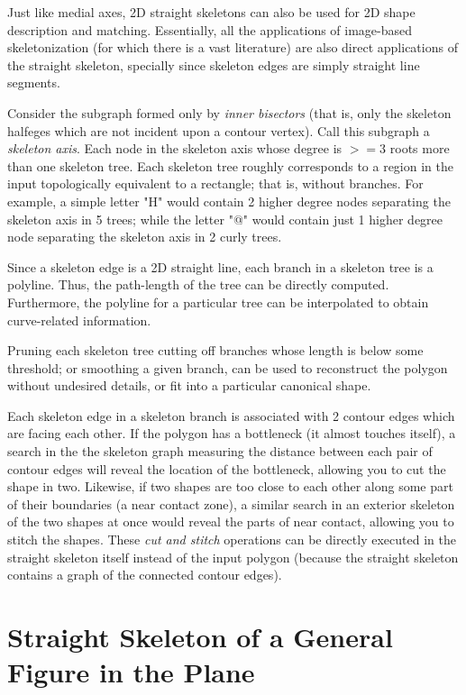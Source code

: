 Just like medial axes, 2D straight skeletons can also be used for 2D shape description and matching. Essentially, all the applications of image-based skeletonization (for which there is a vast literature) are also direct applications of the straight skeleton, specially since skeleton edges are simply straight line segments.

Consider the subgraph formed only by \textit{inner bisectors} (that is, only the skeleton halfeges which are not incident upon a contour vertex). Call this subgraph a {\em skeleton axis}.
Each node in the skeleton axis whose degree is $>=3$ roots more than one skeleton tree. Each skeleton tree roughly corresponds to a region in the input topologically equivalent to a rectangle; that is, without branches. For example, a simple letter "H" would contain 2 higher degree nodes separating the skeleton axis in 5 trees; while the letter "@" would contain just 1 higher degree node separating the skeleton axis in 2 curly trees. 

Since a skeleton edge is a 2D straight line, each branch in a skeleton tree is a polyline. Thus, the path-length of the tree can be directly computed. Furthermore, the polyline for a particular tree can be interpolated to obtain curve-related information.

Pruning each skeleton tree cutting off branches whose length is below some threshold; or smoothing a given branch, can be used to reconstruct the polygon without undesired details, or fit into a particular canonical shape.

Each skeleton edge in a skeleton branch is associated with 2 contour edges which are facing each other. If the polygon has a bottleneck (it almost touches itself), a search in the the skeleton graph measuring the distance between each pair of contour edges will reveal the location of the bottleneck, allowing you to cut the shape in two. Likewise, if two shapes are too close to each other along some part of their boundaries (a near contact zone), a similar search in an exterior skeleton of the two shapes at once would reveal the parts of near contact, allowing you to stitch the shapes. These \textit{cut and stitch} operations can be directly executed in the straight skeleton itself instead of the input polygon (because the straight skeleton contains a graph of the connected contour edges).


\section{Straight Skeleton of a General Figure in the Plane}

